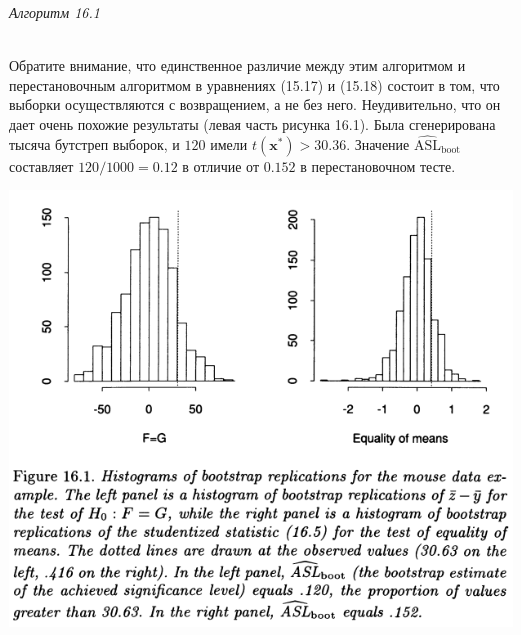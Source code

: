 \begin{center}
    \textit{Алгоритм 16.1}
\end{center}
\\

Обратите внимание, что единственное различие между этим алгоритмом и перестановочным алгоритмом в уравнениях (15.17) и (15.18) состоит в том, что выборки осуществляются с возвращением, а не без него. Неудивительно, что он дает очень похожие результаты (левая часть рисунка 16.1). Была сгенерирована тысяча бутстреп выборок, и $120$ имели $t(\mathbf{x}^{*}) > 30.36$. Значение $\widehat{\text{ASL}}_{\text{boot}}$ составляет $120/1000 = 0.12$ в отличие от $0.152$ в перестановочном тесте.

\noindent
\includegraphics[width=\linewidth]{16/f16.1.png}

